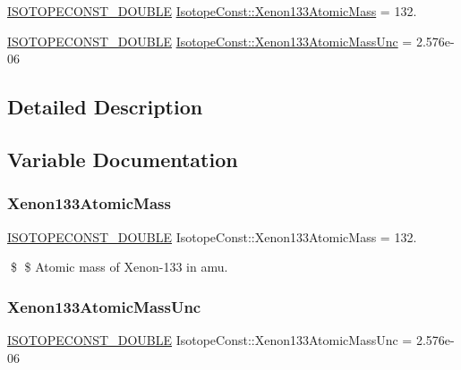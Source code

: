 \begin{DoxyCompactItemize}
\item 
\mbox{\hyperlink{group___isotope_const-_macros_ga8f45a7272ce02c0b4c65c44636ed719a}{I\+S\+O\+T\+O\+P\+E\+C\+O\+N\+S\+T\+\_\+\+D\+O\+U\+B\+LE}} \mbox{\hyperlink{group___isotope_const-_xenon-_xe133_ga3b6f46150ce987a30309a9043e8ea38e}{Isotope\+Const\+::\+Xenon133\+Atomic\+Mass}} = 132.
\item 
\mbox{\hyperlink{group___isotope_const-_macros_ga8f45a7272ce02c0b4c65c44636ed719a}{I\+S\+O\+T\+O\+P\+E\+C\+O\+N\+S\+T\+\_\+\+D\+O\+U\+B\+LE}} \mbox{\hyperlink{group___isotope_const-_xenon-_xe133_gadc86bbe006c6f93e3bcbee38f4217269}{Isotope\+Const\+::\+Xenon133\+Atomic\+Mass\+Unc}} = 2.\+576e-\/06
\end{DoxyCompactItemize}


\subsection{Detailed Description}


\subsection{Variable Documentation}
\mbox{\label{group___isotope_const-_xenon-_xe133_ga3b6f46150ce987a30309a9043e8ea38e}} 
\subsubsection{\texorpdfstring{Xenon133\+Atomic\+Mass}{Xenon133AtomicMass}}
{\footnotesize\ttfamily \mbox{\hyperlink{group___isotope_const-_macros_ga8f45a7272ce02c0b4c65c44636ed719a}{I\+S\+O\+T\+O\+P\+E\+C\+O\+N\+S\+T\+\_\+\+D\+O\+U\+B\+LE}} Isotope\+Const\+::\+Xenon133\+Atomic\+Mass = 132.}

\$ \$ Atomic mass of Xenon-\/133 in amu. \mbox{\label{group___isotope_const-_xenon-_xe133_gadc86bbe006c6f93e3bcbee38f4217269}} 
\subsubsection{\texorpdfstring{Xenon133\+Atomic\+Mass\+Unc}{Xenon133AtomicMassUnc}}
{\footnotesize\ttfamily \mbox{\hyperlink{group___isotope_const-_macros_ga8f45a7272ce02c0b4c65c44636ed719a}{I\+S\+O\+T\+O\+P\+E\+C\+O\+N\+S\+T\+\_\+\+D\+O\+U\+B\+LE}} Isotope\+Const\+::\+Xenon133\+Atomic\+Mass\+Unc = 2.\+576e-\/06}

